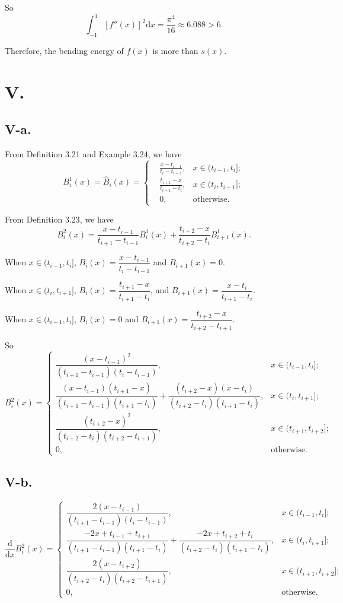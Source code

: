 \documentclass[a4paper]{article}
\begin{document}
So $$\int_{-1}^{1}[f''(x)]^2 \mathrm{d}x=\frac{\pi^4}{16}\approx6.088>6.$$

Therefore, the bending energy of $f(x)$ is more than $s(x)$.

\section*{V.}
\subsection*{V-a.}
From Definition 3.21 and Example 3.24, we have
$$
B^1_i(x)=\hat{B}_i(x)=
\left\{
\begin{aligned}
  &\frac{x-t_{i-1}}{t_i-t_{i-1}}, &x\in (t_{i-1},t_i];\\
  &\frac{t_{i+1}-x}{t_{i+1}-t_{i}}, &x\in (t_i,t_{i+1}]; \\
  &0, &\text{otherwise}.
\end{aligned}
\right.
$$

From Definition 3.23, we have 
$$B_i^{2}(x)=\frac{x-t_{i-1}}{t_{i+1}-t_{i-1}}B_i^1(x)+\frac{t_{i+2}-x}{t_{i+2}-t_i}B_{i+1}^1(x).$$

When $x\in(t_{i-1},t_i]$, $B_i(x)=\dfrac{x-t_{i-1}}{t_i-t_{i-1}}$ and $B_{i+1}(x)=0$.

When $x\in (t_i,t_{i+1}]$, $B_i(x)=\dfrac{t_{i+1}-x}{t_{i+1}-t_{i}}$, and $B_{i+1}(x)=\dfrac{x-t_{i}}{t_{i+1}-t_{i}}$.

When $x\in(t_{i-1},t_i]$, $B_i(x)=0$ and $B_{i+1}(x)=\dfrac{t_{i+2}-x}{t_{i+2}-t_{i+1}}$.

So 
$$
B_i^2(x)=\begin{cases}
  \dfrac{(x-t_{i-1})^2}{(t_{i+1}-t_{i-1})(t_i-t_{i-1})},&x\in(t_{i-1},t_i];\\
  \dfrac{(x-t_{i-1})(t_{i+1}-x)}{(t_{i+1}-t_{i-1})(t_{i+1}-t_i)}+\dfrac{(t_{i+2}-x)(x-t_i)}{(t_{i+2}-t_i)(t_{i+1}-t_i)},&x\in(t_i,t_{i+1}];\\
  \dfrac{(t_{i+2}-x)^2}{(t_{i+2}-t_i)(t_{i+2}-t_{i+1})},&x\in(t_{i+1},t_{i+2}];\\
  0,&\text{otherwise.}
\end{cases}
$$


\subsection*{V-b.}
$$
\frac{\mathrm{d}}{\mathrm{d}x}B_i^2(x)=\begin{cases}
  \dfrac{2(x-t_{i-1})}{(t_{i+1}-t_{i-1})(t_i-t_{i-1})},&x\in(t_{i-1},t_i];\\
  \dfrac{-2x+t_{i-1}+t_{i+1}}{(t_{i+1}-t_{i-1})(t_{i+1}-t_i)}+\dfrac{-2x+t_{i+2}+t_i}{(t_{i+2}-t_i)(t_{i+1}-t_i)},&x\in(t_i,t_{i+1}];\\
  \dfrac{2(x-t_{i+2})}{(t_{i+2}-t_i)(t_{i+2}-t_{i+1})},&x\in(t_{i+1},t_{i+2}];\\
  0,&\text{otherwise.}
\end{cases}
$$
\end{document}
